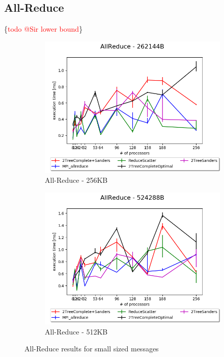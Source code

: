 \documentclass[sigplan,review,anonymous]{acmart}\settopmatter{printfolios=true,printccs=false,printacmref=false}
\begin{document}
\subsection{All-Reduce}
\ifcmts \{\textcolor{red}{todo @Sir lower bound}\}
\begin{figure}
\centering
\begin{subfigure}{.25\textwidth}
  \centering
  \includegraphics[width=1\linewidth]{images/Results/AllReduce/allreduce_comp1_262144B.png}
  \caption{All-Reduce - 256KB}
  \label{reduce-selected-256B}
\end{subfigure}%
\begin{subfigure}{.25\textwidth}
  \centering
  \includegraphics[width=1\linewidth]{images/Results/AllReduce/allreduce_comp1_524288B.png}
  \caption{All-Reduce - 512KB}
  \label{reduce-selected-512B}
\end{subfigure}
\caption{All-Reduce results for small sized messages}
\label{graph-reduce-small-selected}
\end{figure}
\end{document}
